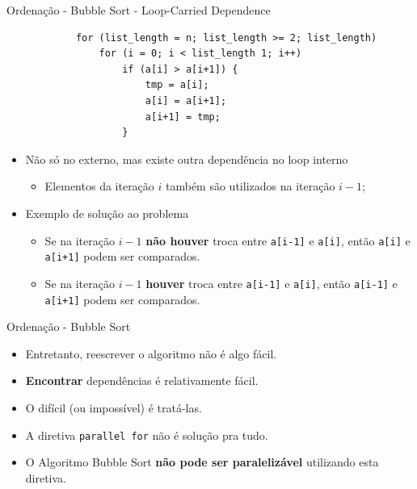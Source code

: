 	\begin{frame}[fragile]{Ordenação - Bubble Sort - Loop-Carried Dependence}
		\begin{verbatim}
			for (list_length = n; list_length >= 2; list_length) 
				for (i = 0; i < list_length 1; i++)
					if (a[i] > a[i+1]) { 
						tmp = a[i];
						a[i] = a[i+1];
						a[i+1] = tmp;
					}
		\end{verbatim}
		\begin{itemize}
			\setlength\itemsep{1em}
			\item Não só no externo, mas existe outra dependência no loop interno
			\begin{itemize}
				\item Elementos da iteração $i$ também são utilizados na iteração $i-1$;
			\end{itemize}
			\item Exemplo de solução ao problema
			\begin{itemize}
				\setlength\itemsep{0.5em}
				\item Se na iteração $i-1$ \textbf{não houver} troca entre {\tt a[i-1]} e {\tt a[i]}, então {\tt a[i]} e {\tt a[i+1]} podem ser comparados.
				\item Se na iteração $i-1$ \textbf{houver} troca entre {\tt a[i-1]} e {\tt a[i]}, então {\tt a[i-1]} e {\tt a[i+1]} podem ser comparados.
			\end{itemize}
		\end{itemize}
\end{frame}

			
	\begin{frame}{Ordenação - Bubble Sort}
		\begin{itemize}
			\setlength\itemsep{1em}
			\item Entretanto, reescrever o algoritmo não é algo fácil.
					\bigskip
			\item \textbf{Encontrar} dependências é relativamente fácil. 
			\item O difícil (ou impossível) é tratá-las.
					\bigskip
			\item A diretiva {\tt parallel for} não é solução pra tudo.
					\bigskip
					\pause
			\item O Algoritmo Bubble Sort \textbf{não pode ser paralelizável} utilizando esta diretiva.
		\end{itemize}
	\end{frame}











